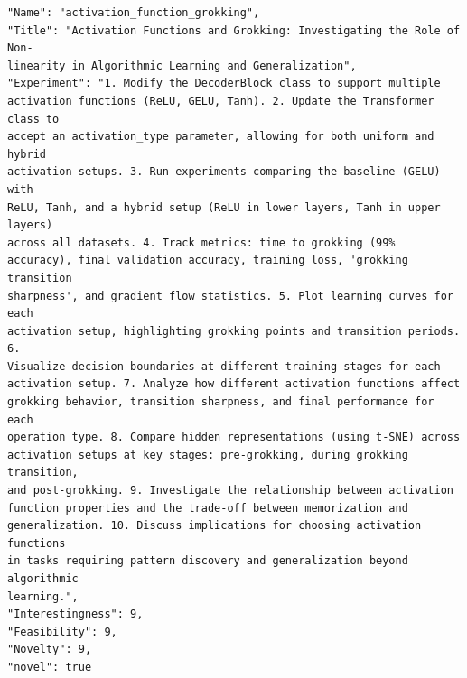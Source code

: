 \documentclass[11pt, a4paper]{include/gdm_format}
\begin{document}
\begin{tcolorbox}[breakable,colback=blue!5!white, colframe=blue!75!black, title=Idea 42/50 - \texttt{activation\_function\_grokking}]
\small
\begin{verbatim}
"Name": "activation_function_grokking",
"Title": "Activation Functions and Grokking: Investigating the Role of Non-
linearity in Algorithmic Learning and Generalization",
"Experiment": "1. Modify the DecoderBlock class to support multiple
activation functions (ReLU, GELU, Tanh). 2. Update the Transformer class to
accept an activation_type parameter, allowing for both uniform and hybrid
activation setups. 3. Run experiments comparing the baseline (GELU) with
ReLU, Tanh, and a hybrid setup (ReLU in lower layers, Tanh in upper layers)
across all datasets. 4. Track metrics: time to grokking (99%
accuracy), final validation accuracy, training loss, 'grokking transition
sharpness', and gradient flow statistics. 5. Plot learning curves for each
activation setup, highlighting grokking points and transition periods. 6.
Visualize decision boundaries at different training stages for each
activation setup. 7. Analyze how different activation functions affect
grokking behavior, transition sharpness, and final performance for each
operation type. 8. Compare hidden representations (using t-SNE) across
activation setups at key stages: pre-grokking, during grokking transition,
and post-grokking. 9. Investigate the relationship between activation
function properties and the trade-off between memorization and
generalization. 10. Discuss implications for choosing activation functions
in tasks requiring pattern discovery and generalization beyond algorithmic
learning.",
"Interestingness": 9,
"Feasibility": 9,
"Novelty": 9,
"novel": true
\end{verbatim}
\end{tcolorbox}
\end{document}
